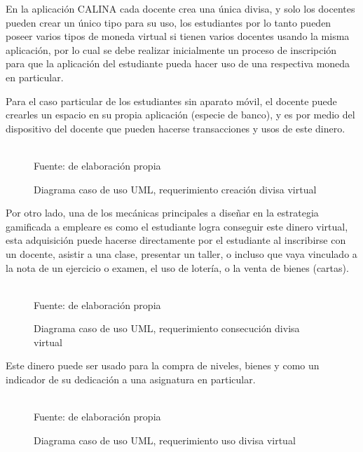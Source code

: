 En la aplicación CALINA cada docente crea una única divisa, y solo los docentes pueden crear un único tipo 
para su uso, los estudiantes por lo tanto pueden poseer varios tipos de moneda virtual si tienen varios 
docentes usando la misma aplicación, por lo cual se debe realizar inicialmente un proceso de inscripción para
que la aplicación del estudiante pueda hacer uso de una respectiva moneda en particular.

Para el caso particular de los estudiantes sin aparato móvil, el docente puede crearles un espacio en su
propia aplicación (especie de banco), y es por medio del dispositivo del docente que pueden hacerse 
transacciones y usos de este dinero.

\begin{figure}[ht]
\caption{Diagrama caso de uso UML, requerimiento creación divisa virtual}
\label{img:UMLcreaciondivisa}
\centering
\begin{adjustbox}{width=13cm}
	
\end{adjustbox}
\\
{\footnotesize Fuente: de elaboración propia}
\end{figure}

Por otro lado, una de los mecánicas principales a diseñar en la estrategia gamificada a empleare es como el 
estudiante logra conseguir este dinero virtual, esta adquisición puede hacerse directamente por el estudiante 
al inscribirse con un docente, asistir a una clase, presentar un taller, o incluso que vaya vinculado a 
la nota de un ejercicio o examen, el uso de lotería, o la venta de bienes (cartas).

\begin{figure}[!htb]
\caption{Diagrama caso de uso UML, requerimiento consecución divisa virtual}
\label{img:UMLconsecuciondivisa}
\centering
\begin{adjustbox}{width=13cm}
	
\end{adjustbox}
\\
{\footnotesize Fuente: de elaboración propia}
\end{figure}

Este dinero puede ser usado para la compra de niveles, bienes y como un indicador de su dedicación a una 
asignatura en particular.

\begin{figure}[!htb]
\caption{Diagrama caso de uso UML, requerimiento uso divisa virtual}
\label{img:UMLusodivisa}
\centering
\begin{adjustbox}{width=15cm}
	
\end{adjustbox}
\\
{\footnotesize Fuente: de elaboración propia}
\end{figure}

